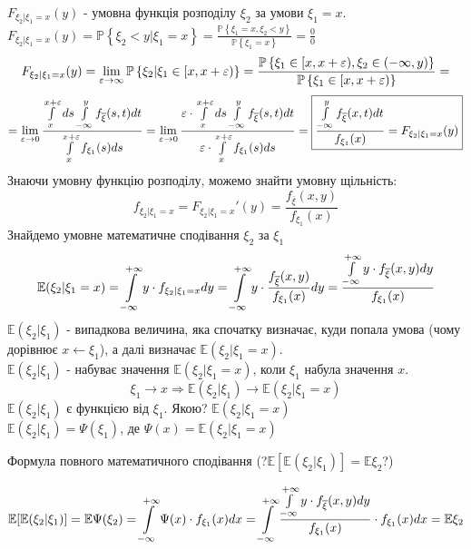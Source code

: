 $F_{\xi_2 | \xi_1 = x} (y)$ - умовна функція розподілу $\xi_2$ за умови $\xi_1 = x$.\\
$ F_{\xi_2 | \xi_1 = x} (y) = \mathbb{P} \left\lbrace \xi_2 < y | \xi_1 = x  \right\rbrace = \frac{\mathbb{P} \left\lbrace \xi_1  = x , \xi_2 < y \right\rbrace}{ \mathbb{P} \left\lbrace \xi_1 = x \right\rbrace} = \frac{0}{0} $
\\$$   F_{\xi_2 | \xi_1 = x} (y) = \lim\limits_{\varepsilon \to  \infty}{
 \mathbb{P} \left\lbrace  \xi_2 | \xi_1 \in [x, x+ \varepsilon ) \right\rbrace
 } =  \frac{ \mathbb{P} \left\lbrace \xi_1 \in [x, x+ \varepsilon ) , \xi_2 \in (- \infty, y)\right\rbrace}{ \mathbb{P} \left\lbrace \xi_1 \in [x, x + \varepsilon ) \right\rbrace} =
  $$
	$$
	=  \lim\limits_{\varepsilon \to  0} { \frac{\int\limits_{x}^{ x+\varepsilon }{ ds  \int\limits_{- \infty}^{ y}{ f_{ \overline{\xi}}}(s,t)dt}}{
  \int\limits_{x}^{ x+\varepsilon }{ f_{\xi_1} (s) ds}}
  } =    \lim\limits_{\varepsilon \to  0} { \frac{\varepsilon \cdot\int\limits_{x}^{ x+\varepsilon }{ ds  \int\limits_{- \infty}^{ y}{ f_{ \overline{\xi}}}(s,t)dt}}{ \varepsilon \cdot
  \int\limits_{x}^{ x+\varepsilon }{  f_{\xi_1} (s) ds}}
  }  =  \fbox{$ \displaystyle\frac{  \int\limits_{- \infty}^{ y}{ f_{ \overline{\xi}} }(x,t)dt}{ f_{\xi_1} (x)} = F_{\xi_2 | \xi_1 = x} (y)$}
	$$
Знаючи умовну функцію розподілу, можемо знайти умовну щільність:
	$$
	f_{\xi_2 | \xi_1 = x} = F_{\xi_2| \xi_1 = x}'(y) = \frac{f_{\overline{\xi}}(x,y)}{ f_{\xi_1}(x)}
	$$
Знайдемо умовне математичне сподівання $\xi_2$ за $\xi_1$
	$$
	\mathbb{E}(\xi_2 | \xi_1 = x) =  \int\limits_{-\infty}^{ +\infty}{ y \cdot f_{\xi_2 | \xi_1 = x} dy} =  \int\limits_{-\infty}^{ +\infty}{ y \cdot \frac{f_{\overline{\xi}}(x,y)}{ f_{\xi_1} (x)}  dy} =
	\frac{
	\int\limits_{-\infty}^{ +\infty}{ y \cdot f_{\overline{\xi}}(x,y)}dy}{ f_{\xi_1} (x)}
	$$
$ \mathbb{E} (\xi_2| \xi_1)$ - випадкова величина, яка спочатку визначає, куди попала умова (чому дорівнює $x \longleftarrow \xi_1$), а далі визначає $\mathbb{E}(\xi_2| \xi_1 = x)$.\\
$\mathbb{E}(\xi_2| \xi_1)$ - набуває значення $ \mathbb{E}(\xi_2 | \xi_1 = x)$, коли $\xi_1$ набула значення $x$.
$$\xi_1 \longrightarrow x \Rightarrow \mathbb{E}(\xi_2 | \xi_1) \longrightarrow \mathbb{E}(\xi_2 | \xi_1 = x)$$
$ \mathbb{E}(\xi_2 | \xi_1)$ є функцією від $\xi_1$. Якою? $ \mathbb{E}(\xi_2 | \xi_1 = x)$\\
$ \mathbb{E} (\xi_2 | \xi_1 ) = \Psi (\xi_1)$, де $ \Psi(x) = \mathbb{E}( \xi_2 | \xi_1 = x)$

\begin{center}
	Формула повного математичного сподівання (?$\mathbb{E}[\mathbb{E}(\xi_2 | \xi_1)] = \mathbb{E}\xi_2$?)
\end{center}
$$\mathbb{E}[\mathbb{E}(\xi_2 | \xi_1)] = \mathbb{E}\Psi  (\xi_2) =  \int\limits_{-\infty}^{ +\infty}{\Psi(x) \cdot f_{\xi_1} (x)dx} =  \int\limits_{-\infty}^{ +\infty}{
\frac{
\int\limits_{-\infty}^{ +\infty}{ y \cdot f_{\overline{\xi}}(x,y)}dy}{ f_{\xi_1} (x)} \cdot f_{\xi_1} (x) dx} = \mathbb{E} \xi_2$$

